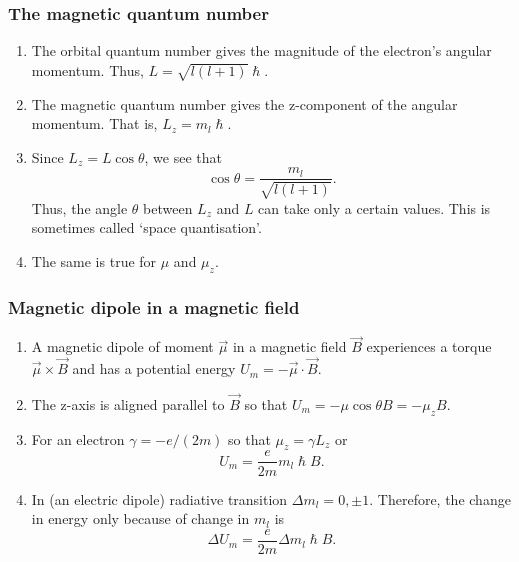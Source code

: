 \documentclass{beamer}
\begin{document}
\begin{frame}
\frametitle{The magnetic quantum number}
\begin{enumerate}
\item The orbital quantum number gives the magnitude of the electron's angular
momentum. Thus, $L = \sqrt{l(l + 1)}\hslash$.
\item The magnetic quantum number gives the z-component of the angular momentum.
That is, $L_z = m_l\hslash$. 
\item Since $L_z = L\cos\theta$, we see that
\begin{equation}\label{e10}
\cos\theta = \frac{m_l}{\sqrt{l(l + 1)}}.
\end{equation}
Thus, the angle $\theta$ between $L_z$ and $L$ can take only a certain values. 
This is sometimes called `space quantisation'.
\item The same is true for $\mu$ and $\mu_z$.
\end{enumerate}
\end{frame}

\begin{frame}
\frametitle{Magnetic dipole in a magnetic field}
\begin{enumerate}
\item A magnetic dipole of moment $\vec{\mu}$ in a magnetic field $\vec{B}$ 
experiences a torque $\vec{\mu} \times \vec{B}$ and has a potential energy
$U_m = -\vec{\mu}\cdot\vec{B}$.
\item The z-axis is aligned parallel to $\vec{B}$ so that $U_m=-\mu\cos\theta B
= -\mu_z B$.
\item For an electron $\gamma = -e/(2m)$ so that $\mu_z = \gamma L_z$ or
\begin{equation}\label{e11}
U_m = \frac{e}{2m}m_l\hslash B.
\end{equation}
\item In (an electric dipole) radiative transition $\Delta m_l = 0, \pm 1$.
Therefore, the change in energy only because of change in $m_l$ is
\begin{equation}\label{e12}
\Delta U_m = \frac{e}{2m}\Delta m_l\hslash B.
\end{equation}
\end{enumerate}
\end{frame}
\end{document}
